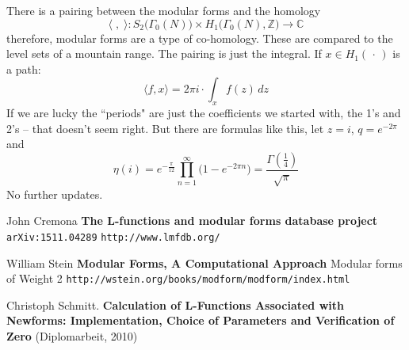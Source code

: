 \documentclass[12pt]{article}
\begin{document}
\noindent There is a pairing between the modular forms and the homology
$$  \langle \; , \;  \rangle : S_2 \big( \Gamma_0(N) \big) \times H_1 \big( \Gamma_0(N) , \mathbb{Z} \big) \to \mathbb{C}$$
therefore, modular forms are a type of co-homology.  These are compared to the level sets of a mountain range.  The pairing is just the integral.  If $x \in H_1( \, \cdot \, )$ is a path:
$$ \langle f, x \rangle = 2\pi i \cdot \int_x f(z) \, dz $$
If we are lucky the ``periods" are just the coefficients we started with, the 1's and 2's -- that doesn't seem right.  But there are formulas like this, let $z = i$, $q = e^{-2\pi}$ and 
$$ \eta(i) =  e^{-\frac{\pi}{12}} \prod_{n=1}^\infty \big( 1 - e^{-2\pi n} \big) = \frac{\Gamma(\frac{1}{4})}{\sqrt{\pi}} $$
No further updates.

\vfill

\selectfont \fontsize{12}{10}\selectfont

\begin{thebibliography}{}

\item John Cremona \textbf{The L-functions and modular forms database project}  \texttt{arXiv:1511.04289}  
\texttt{http://www.lmfdb.org/}

\item William Stein \textbf{Modular Forms, A Computational Approach} Modular forms of Weight 2 \texttt{http://wstein.org/books/modform/modform/index.html}

\item Christoph Schmitt. \textbf{Calculation of L-Functions Associated with
Newforms: Implementation, Choice of
Parameters and Verification of Zero} (Diplomarbeit, 2010)

\end{thebibliography}

\end{document}
